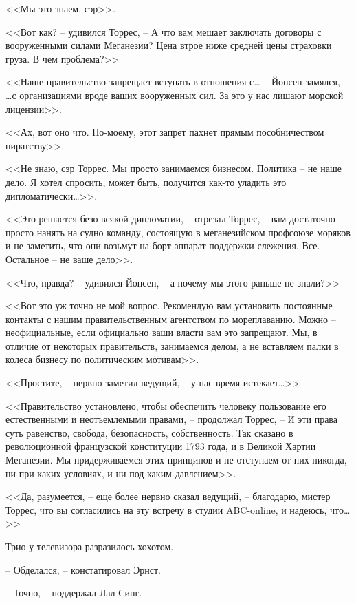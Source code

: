<<Мы это знаем, сэр>>.

<<Вот как? -- удивился Торрес, -- А что вам мешает заключать договоры с вооруженными силами Меганезии? Цена втрое ниже средней цены страховки груза. В чем проблема?>>

<<Наше правительство запрещает вступать в отношения с\ldots{} -- Йонсен замялся, -- \ldots{}с организациями вроде ваших вооруженных сил. За это у нас лишают морской лицензии>>.

<<Ах, вот оно что. По-моему, этот запрет пахнет прямым пособничеством пиратству>>.

<<Не знаю, сэр Торрес. Мы просто занимаемся бизнесом. Политика -- не наше дело. Я хотел спросить, может быть, получится как-то уладить это дипломатически\ldots{}>>.

<<Это решается безо всякой дипломатии, -- отрезал Торрес, -- вам достаточно просто нанять на судно команду, состоящую в меганезийском профсоюзе моряков и не заметить, что они возьмут на борт аппарат поддержки слежения. Все. Остальное -- не ваше дело>>.

<<Что, правда? -- удивился Йонсен, -- а почему мы этого раньше не знали?>>

<<Вот это уж точно не мой вопрос. Рекомендую вам установить постоянные контакты с нашим правительственным агентством по мореплаванию. Можно -- неофициальные, если официально ваши власти вам это запрещают. Мы, в отличие от некоторых правительств, занимаемся делом, а не вставляем палки в колеса бизнесу по политическим мотивам>>.

<<Простите, -- нервно заметил ведущий, -- у нас время истекает\ldots{}>>

<<Правительство установлено, чтобы обеспечить человеку пользование его естественными и неотъемлемыми правами, -- продолжал Торрес, -- И эти права суть равенство, свобода, безопасность, собственность. Так сказано в революционной французской конституции 1793 года, и в Великой Хартии Меганезии. Мы придерживаемся этих принципов и не отступаем от них никогда, ни при каких условиях, и ни под каким давлением>>.

<<Да, разумеется, -- еще более нервно сказал ведущий, -- благодарю, мистер Торрес, что вы согласились на эту встречу в студии ABC-online, и надеюсь, что\ldots{}>>

Трио у телевизора разразилось хохотом.

-- Обделался, -- констатировал Эрнст.

-- Точно, -- поддержал Лал Синг.


